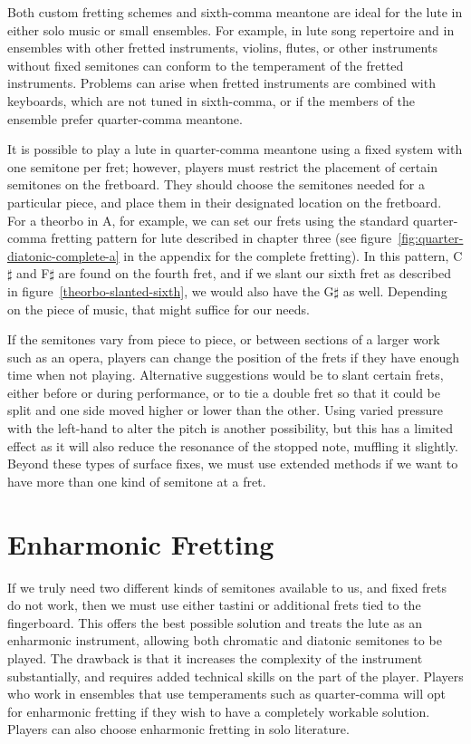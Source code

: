 Both custom fretting schemes and sixth-comma meantone are ideal for the lute in either solo music or small ensembles.
For example, in lute song repertoire and in ensembles with other fretted instruments, violins, flutes, or other
instruments without fixed semitones can conform to the temperament of the fretted instruments. Problems can arise when
fretted instruments are combined with keyboards, which are not tuned in sixth-comma, or if the members of the ensemble
prefer quarter-comma meantone.

It is possible to play a lute in quarter-comma meantone using a fixed system with one semitone per fret; however,
players must restrict the placement of certain semitones on the fretboard. They should choose the semitones needed for a
particular piece, and place them in their designated location on the fretboard. For a theorbo in A, for example, we can
set our frets using the standard quarter-comma fretting pattern for lute described in chapter three (see
figure~\ref{fig:quarter-diatonic-complete-a} in the appendix for the complete fretting). In this pattern, C$\sharp$ and
F$\sharp$ are found on the fourth fret, and if we slant our sixth fret as described in 
figure~\ref{theorbo-slanted-sixth}, we would also have the G$\sharp$ as well. Depending on the piece of music, that 
might suffice for our needs.

If the semitones vary from piece to piece, or between sections of a larger work such as an opera, players can change the
position of the frets if they have enough time when not playing. Alternative suggestions would be to slant certain
frets, either before or during performance, or to tie a double fret so that it could be split and one side moved higher
or lower than the other. Using varied pressure with the left-hand to alter the pitch is another possibility, but this
has a limited effect as it will also reduce the resonance of the stopped note, muffling it slightly. Beyond these types
of surface fixes, we must use extended methods if we want to have more than one kind of semitone at a fret.

\section{Enharmonic Fretting}

If we truly need two different kinds of semitones available to us, and fixed frets do not work, then we must use either
tastini or additional frets tied to the fingerboard. This offers the best possible solution and treats the lute as an
enharmonic instrument, allowing both chromatic and diatonic semitones to be played. The drawback is that it increases
the complexity of the instrument substantially, and requires added technical skills on the part of the player. Players
who work in ensembles that use temperaments such as quarter-comma will opt for enharmonic fretting if they wish to have
a completely workable solution. Players can also choose enharmonic fretting in solo literature.

